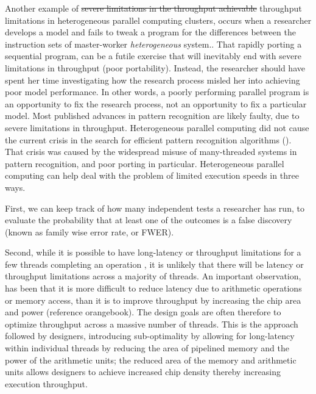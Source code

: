 \documentclass[10pt]{article}[draft]
\begin{document}
\begin{itemize}
		Another example of \st{severe  limitations in the throughput achievable} throughput limitations in heterogeneous parallel computing clusters, occurs when a researcher develops a model and fails to tweak a program for the differences between the  instruction sets of master-worker \emph{heterogeneous} system.. That rapidly porting a sequential program, can be a futile exercise that will inevitably end with severe limitations in throughput (poor portability). Instead, the researcher should have spent her time investigating how the research process misled her into achieving poor model performance. In other words, a poorly performing parallel program is an opportunity to fix the research process, not an opportunity to fix a particular model. Most published advances in pattern recognition are likely faulty, due to severe limitations in throughput. Heterogeneous parallel computing did not cause the current crisis in the search for efficient pattern recognition algorithms (). That crisis was caused by the widespread misuse of many-threaded systems in pattern recognition, and poor porting in particular. Heterogeneous parallel computing can help deal with the problem of limited execution speeds in three ways. 
		  
		  First, we can keep track of how many independent tests a researcher has run, to evaluate the probability that at least one of the outcomes is a false discovery (known as family wise error rate, or FWER). 
		  
		  
		  
		  Second, while it is possible to have long-latency or throughput limitations for a few threads completing an operation , it is unlikely that there will be latency or throughput limitations across a majority of threads. An important observation, has been that it is more difficult to reduce latency due to arithmetic operations or memory access, than it is to improve throughput by increasing the chip area and power (reference orangebook). The design goals are often therefore to optimize throughput across a massive number of threads. This is the approach followed by designers, introducing sub-optimality by allowing for long-latency within individual threads by reducing the area of pipelined memory and the power of the arithmetic units; the reduced area of the memory and arithmetic units allows designers to achieve increased chip density thereby increasing execution throughput. 
		  

\end{itemize}
\end{document}
